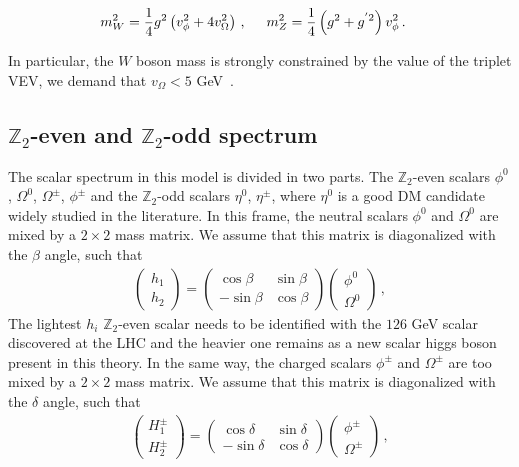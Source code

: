 \documentclass[12pt,letterpaper]{article}
\begin{document}
\begin{align}
\label{eq:mW-mZ}
m_W^2 &= \dfrac{1}{4}g^2\left(v_{\phi}^2+4v_{\Omega}^2\right)\,,\hspace{0.5 cm} 
m_Z^2=\dfrac{1}{4}\left(g^2+g^{'2}\right)v_{\phi}^2\,.
\end{align}

In particular, the $W$ boson mass is strongly constrained by the value of the triplet VEV, we demand that $v_{\Omega}< 5$ GeV~\cite{Agashe:2014kda}.

\subsection{$\mathbb{Z}_2$-even and $\mathbb{Z}_2$-odd spectrum}
The scalar spectrum in this model is divided in two parts. The $\mathbb{Z}_2$-even scalars $\phi^0$, $\Omega^0$, $\Omega^{\pm}$, $\phi^{\pm}$ and the $\mathbb{Z}_2$-odd scalars $\eta^0$, $\eta^{\pm}$, where $\eta^0$ is a good DM candidate widely studied in the literature.
%
In this frame, the neutral scalars $\phi^0$ and $\Omega^0$ are mixed by a $2\times 2$ mass matrix. We assume that this matrix is diagonalized with the $\beta$ angle, such that
%
\begin{align}
\label{eq:beta-mixing}
\begin{pmatrix}
h_1 \\ h_2 
\end{pmatrix}=
\begin{pmatrix}
\cos\beta & \sin\beta \\
-\sin\beta & \cos\beta
\end{pmatrix}
\begin{pmatrix}
\phi^0 \\ \Omega^0 
\end{pmatrix}\,,
\end{align} 
%
The lightest $h_i$ $\mathbb{Z}_2$-even scalar needs to be identified with the $126$ GeV scalar discovered at the LHC and the heavier one remains as a new scalar higgs boson present in this theory.  
%
In the same way, the charged scalars $\phi^{\pm}$ and $\Omega^{\pm}$ are too mixed by a $2\times 2$ mass matrix. We assume that this matrix is diagonalized with the $\delta$ angle, such that
%
\begin{align}
\label{eq:delta-mixing}
\begin{pmatrix}
H_1^{\pm} \\ H_2^{\pm} 
\end{pmatrix}=
\begin{pmatrix}
\cos\delta & \sin\delta \\
-\sin\delta & \cos\delta
\end{pmatrix}
\begin{pmatrix}
\phi^{\pm} \\ \Omega^{\pm} 
\end{pmatrix}\,,
\end{align} 
\end{document}
